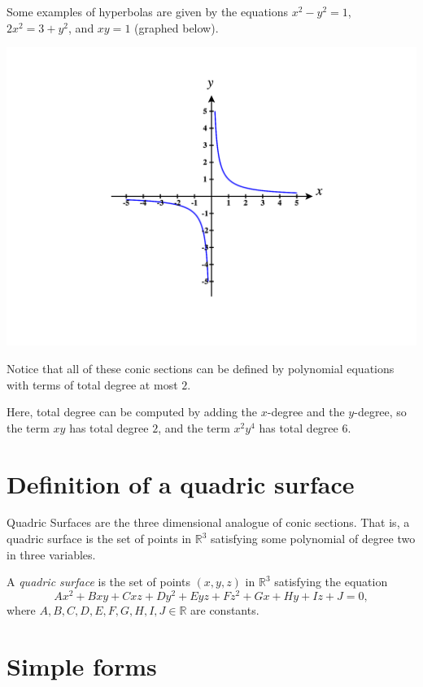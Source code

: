 \documentclass{ximera}
\begin{document}
Some examples of hyperbolas are given by the equations $x^2-y^2=1$, $2x^2=3+y^2$, and $xy=1$ (graphed below).

\begin{image}
\includegraphics[width = \textwidth]{CalcPlot3D-hyperbola}
\end{image}

Notice that all of these conic sections can be defined by polynomial equations with terms of total degree at most $2$.

Here, total degree can be computed by adding the $x$-degree and the $y$-degree, so the term $xy$ has total degree $2$, and the term $x^2y^4$ has total degree $6$.


\section*{Definition of a quadric surface}

Quadric Surfaces are the three dimensional analogue of conic sections. That is, a quadric surface is the set of points in $\mathbb{R}^3$ satisfying some polynomial of degree two in three variables.

\begin{definition}
A \emph{quadric surface} is the set of points $(x,y,z)$ in $\mathbb{R}^3$ satisfying the equation
\[
Ax^2 + Bxy + Cxz + Dy^2 + Eyz + Fz^2 +Gx + Hy + Iz + J = 0,
\]
where $A,B,C,D,E,F,G,H,I,J\in\mathbb{R}$ are constants.
\end{definition}

\section*{Simple forms}
\end{document}
